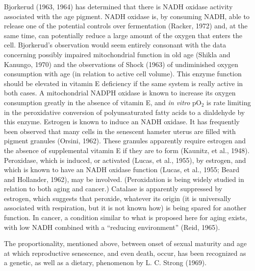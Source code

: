 Bjorkerud (1963, 1964) has determined that there is NADH oxidase activity associated with the age pigment. NADH oxidase is, by consuming NADH, able to release one of the potential controls over fermentation (Racker, 1972) and, at the same time, can potentially reduce a large
amount of the oxygen that enters the cell. Bjorkerud's observation would seem entirely consonant with the data concerning possibly impaired mitochondrial function in old age (Shikla and Kanungo, 1970) and the observations of Shock (1963) of undiminished oxygen consumption with age
(in relation to active cell volume). This enzyme function should be elevated in vitamin E deficiency if the same system is really active in both cases. A mitochondrial NADPH oxidase is known to increase its oxygen consumption greatly in the absence of vitamin E, and \textit{in vitro} pO$_{2}$ is
rate limiting in the peroxidative conversion of polyunsaturated fatty acids to a dialdehyde by this enzyme. Estrogen is known to induce an NADH oxidase. It has frequently been observed that many cells in the senescent hamster uterus are filled with pigment granules (Orsini, 1962). These
granules apparently require estrogen and the absence of supplemental vitamin E if they are to form (Kaunitz, et al., 1948). Peroxidase, which is induced, or activated (Lucas, et al., 1955), by estrogen, and which is known to have an NADH oxidase function (Lucas, et al., 1955; Beard and Hollander, 1962), may be
involved. (Peroxidation is being widely studied in relation to both aging and cancer.) Catalase is apparently suppressed by estrogen, which suggests that peroxide, whatever its origin (it is universally associated with respiration, but it is not known how) is being spared for another function. In cancer, a condition
similar to what is proposed here for aging exists, with low NADH combined with a ``reducing environment'' (Reid, 1965).

The proportionality, mentioned above, between onset of sexual maturity and age at which reproductive senescence, and even death, occur, has been recognized as a genetic, as well as a dietary, phenomenon by L. C. Strong (1969).

